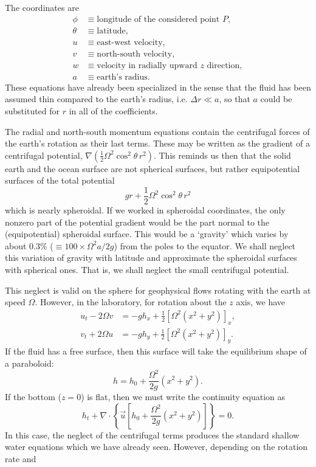 
The coordinates are
\begin{align*}
	\phi   & \equiv \text{longitude of the considered point }P,            \\
	\theta & \equiv \text{latitude},                                       \\
	u      & \equiv \text{east-west velocity},                             \\
	v      & \equiv \text{north-south velocity},                           \\
	w      & \equiv \text{velocity in radially upward }z\text{ direction}, \\
	a      & \equiv \text{earth's radius}.
\end{align*}
These equations have already been specialized in the sense that the fluid has been
assumed thin compared to the earth's radius, i.e. $\Delta r\ll a$, so that $a$ could be
substituted for $r$ in all of the coefficients.

\sourcepagebreak

The radial and north-south momentum equations contain the centrifugal forces
of the earth's rotation as their last terms. These may be written as the gradient of a
centrifugal potential, $\nabla(\tfrac12\Omega^2\cos^2\theta\,r^2)$. This reminds us then that the solid earth and
the ocean surface are not spherical surfaces, but rather equipotential surfaces of the
total potential
\[
	gr+\frac12\Omega^2\cos^2\theta\,r^2
\]
which is nearly spheroidal. If we worked in spheroidal coordinates, the only nonzero
part of the potential gradient would be the part normal to the (equipotential)
spheroidal surface. This would be a `gravity' which varies by about 0.3\%
($\equiv100\times\Omega^2a/2g$) from the poles to the equator. We shall neglect this variation of
gravity with latitude and approximate the spheroidal surfaces with spherical ones.
That is, we shall neglect the small centrifugal potential.

This neglect is valid on the sphere for geophysical flows rotating with the earth
at speed $\Omega$. However, in the laboratory, for rotation about the $z$ axis, we have
\begin{align*}
	u_t-2\Omega v & =-gh_x+\frac12[\Omega^2(x^2+y^2)]_x, \\
	v_t+2\Omega u & =-gh_y+\frac12[\Omega^2(x^2+y^2)]_y.
\end{align*}
If the fluid has a free surface, then this surface will take the equilibrium shape of a
paraboloid:
\[
	h=h_0+\frac{\Omega^2}{2g}(x^2+y^2).
\]
If the bottom ($z=0$) is flat, then we must write the continuity equation as
\[
	h_t+\nabla\cdot\left\{\vec u\left[h_0+\frac{\Omega^2}{2g}(x^2+y^2)\right]\right\}=0.
\]
In this case, the neglect of the centrifugal terms produces the standard shallow water
equations which we have already seen. However, depending on the rotation rate and

